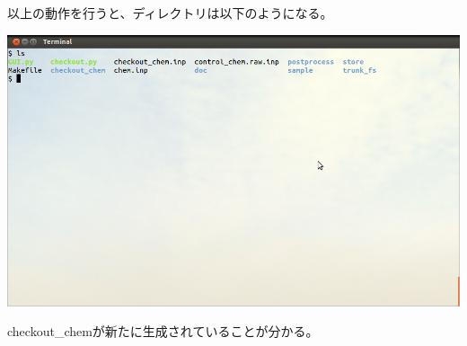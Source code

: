 \documentclass{jsarticle}
\begin{document}
以上の動作を行うと、ディレクトリは以下のようになる。
\begin{center}
\includegraphics[width=.8\textwidth,bb=0 0 962 577]{tutorial_img/070.png}
\end{center}
checkout\_chemが新たに生成されていることが分かる。
\end{document}
